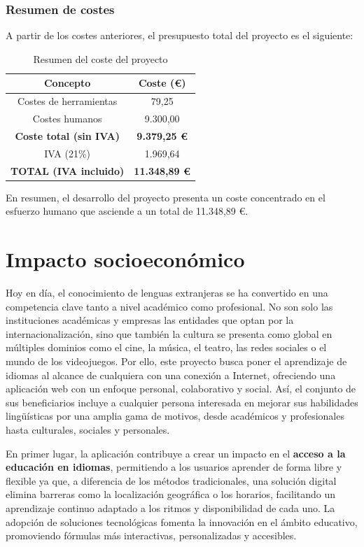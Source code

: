 \subsubsection{Resumen de costes}

A partir de los costes anteriores, el presupuesto total del proyecto es el siguiente:

\begin{table}[H]
\centering
\begin{tabular}{|c|c|}
\hline
\textbf{Concepto} & \textbf{Coste (€)} \\
\hline
Costes de herramientas & 79,25 \\
\hline
Costes humanos & 9.300,00 \\
\hline
\textbf{Coste total (sin IVA)} & \textbf{9.379,25 €} \\
\hline
IVA (21\%) & 1.969,64 \\
\hline
\textbf{TOTAL (IVA incluido)} & \textbf{11.348,89 €} \\
\hline
\end{tabular}
\caption{Resumen del coste del proyecto}
\end{table}

En resumen, el desarrollo del proyecto presenta un coste concentrado en el esfuerzo humano que asciende a un total de 11.348,89 €.

\section{Impacto socioeconómico}

Hoy en día, el conocimiento de lenguas extranjeras se ha convertido en una competencia clave tanto a nivel académico como profesional. No son solo las instituciones académicas y empresas las entidades que optan por la internacionalización, sino que también la cultura se presenta como global en múltiples dominios como el cine, la música, el teatro, las redes sociales o el mundo de los videojuegos. Por ello, este proyecto busca poner el aprendizaje de idiomas al alcance de cualquiera con una conexión a Internet, ofreciendo una aplicación web con un enfoque personal, colaborativo y social. Así, el conjunto de sus beneficiarios incluye a cualquier persona interesada en mejorar sus habilidades lingüísticas por una amplia gama de motivos, desde académicos y profesionales hasta culturales, sociales y personales.

En primer lugar, la aplicación contribuye a crear un impacto en el \textbf{acceso a la educación en idiomas}, permitiendo a los usuarios aprender de forma libre y flexible ya que, a diferencia de los métodos tradicionales, una solución digital elimina barreras como la localización geográfica o los horarios, facilitando un aprendizaje continuo adaptado a los ritmos y disponibilidad de cada uno. La adopción de soluciones tecnológicas fomenta la innovación en el ámbito educativo, promoviendo fórmulas más interactivas, personalizadas y accesibles.

